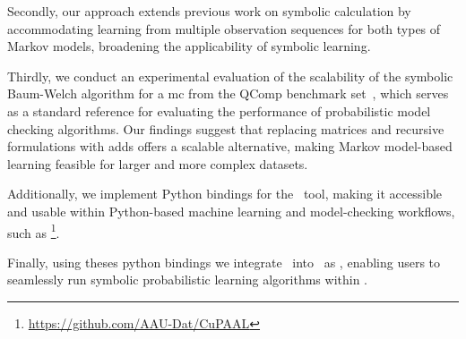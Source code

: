 Secondly, our approach extends previous work on symbolic calculation by accommodating learning from multiple observation sequences for both types of Markov models, broadening the applicability of symbolic learning.

Thirdly, we conduct an experimental evaluation of the scalability of the symbolic Baum-Welch algorithm for a \gls{mc} from the QComp benchmark set~\cite{HartmannsKPQR19}, which serves as a standard reference for evaluating the performance of probabilistic model checking algorithms.
Our findings suggest that replacing matrices and recursive formulations with \glspl{add} offers a scalable alternative, making Markov model-based learning feasible for larger and more complex datasets.

Additionally, we implement Python bindings for the \Cupaal\ tool, making it accessible and usable within Python-based machine learning and model-checking workflows, such as \Jajapy\footnote{\url{https://github.com/AAU-Dat/CuPAAL}}.

Finally, using theses python bindings we integrate \Cupaal\ into \Jajapy\ as \JajapyTwo, enabling users to seamlessly run symbolic probabilistic learning algorithms within \Jajapy.
